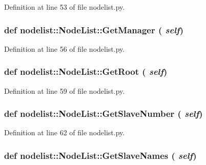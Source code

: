 Definition at line 53 of file nodelist.py.\hypertarget{classnodelist_1_1NodeList_1b2aa331c3a0f257629450ffbb658714}{
\subsubsection[GetManager]{\setlength{\rightskip}{0pt plus 5cm}def nodelist::Node\-List::Get\-Manager ( {\em self})}}
\label{classnodelist_1_1NodeList_1b2aa331c3a0f257629450ffbb658714}




Definition at line 56 of file nodelist.py.\hypertarget{classnodelist_1_1NodeList_5660c96280f53eb22d49ae3ef87857b5}{
\subsubsection[GetRoot]{\setlength{\rightskip}{0pt plus 5cm}def nodelist::Node\-List::Get\-Root ( {\em self})}}
\label{classnodelist_1_1NodeList_5660c96280f53eb22d49ae3ef87857b5}




Definition at line 59 of file nodelist.py.\hypertarget{classnodelist_1_1NodeList_88204b493bfb5af7a4106f79ce65e377}{
\subsubsection[GetSlaveNumber]{\setlength{\rightskip}{0pt plus 5cm}def nodelist::Node\-List::Get\-Slave\-Number ( {\em self})}}
\label{classnodelist_1_1NodeList_88204b493bfb5af7a4106f79ce65e377}




Definition at line 62 of file nodelist.py.\hypertarget{classnodelist_1_1NodeList_ae2a228b04ac23eced9749346e06cf09}{
\subsubsection[GetSlaveNames]{\setlength{\rightskip}{0pt plus 5cm}def nodelist::Node\-List::Get\-Slave\-Names ( {\em self})}}
\label{classnodelist_1_1NodeList_ae2a228b04ac23eced9749346e06cf09}




